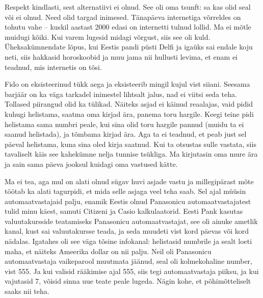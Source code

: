 Respekt kindlasti, sest alternatiivi ei olnud. See oli oma tsunft: sa kas 
olid seal või ei olnud. Need olid targad inimesed. Tänapäeva internetiga võrreldes on 
tohutu vahe -- kuskil aastast 2000 edasi on internetti tulnud lollid. Ma ei 
mõtle muidugi kõiki. Kui varem lugesid midagi võrgust, siis see oli 
kuld. Üheksakümnendate lõpus, kui Eestis pandi 
püsti Delfi ja igaüks sai endale koju
neti, siis hakkasid horoskoobid ja muu jama nii hullusti 
levima, et enam ei teadnud, mis internetis on tõsi. 


Fido on eksisteerinud tükk aega ja eksisteerib mingil kujul vist siiani. 
Seesama barjäär on ka väga tarkadel inimestel lihtsalt jalus, nad ei viitsi 
seda teha. Tollased piirangud olid ka tülikad. Näiteks asjad ei 
käinud reaalajas, vaid pidid kuhugi helistama, saatma oma kirjad ära, panema toru 
hargile. Keegi teine pidi helistama sama numbri peale, kui sina olid toru 
hargile pannud (muidu ta ei saanud helistada), ja tõmbama kirjad ära. Aga ta ei 
teadnud, et peab just sel päeval helistama, kuna sina oled kirja saatnud. Kui ta otsustas 
sulle vastata, siis tavaliselt käis see kahekümne nelja tunnise 
tsükliga. Ma kirjutasin oma mure ära ja sain sama päeva jooksul kuidagi oma 
vastused kätte. 


Ma ei tea, aga mul on 
alati olnud sügav huvi asjade vastu ja millegipärast mõte töötab ka alati 
tagurpidi, et mida selle asjaga veel teha saab. Sel ajal müüsin automaatvastajaid palju, 
enamik Eestis olnud Panasonicu automaatvastajatest tulid minu käest, 
samuti Citizeni ja Casio kalkulaatorid. Eesti 
Pank kasutas valuutakursside teatamiseks Panasonicu 
automaatvastajat, see oli ainuke ametlik kanal, kust sai valuutakursse teada, 
ja seda muudeti vist kord päevas või kord nädalas. Igatahes oli 
see väga tõsine infokanal: helistasid numbrile ja sealt loeti maha, 
et näiteks Ameerika dollar on nii palju. Neil 
oli Panasonicu automaatvastaja vaikeparool muutmata jäänud, seal oli 
kolmekohaline number, vist 555. Ja kui 
valisid rääkimise ajal 555, siis tegi automaatvastaja piiksu, ja kui vajutasid 7, võisid sinna uue teate peale lugeda. Nägin kohe, 
et põhimõtteliselt saaks nii teha. 


